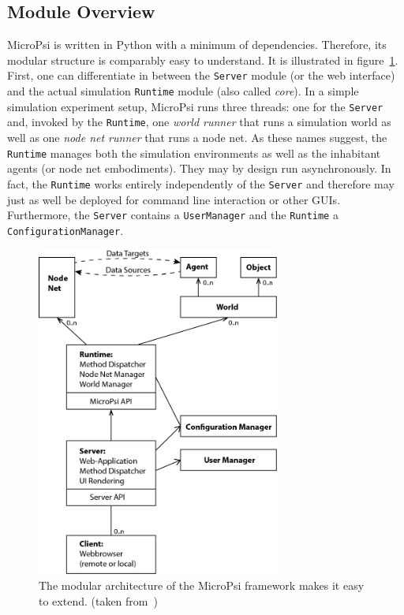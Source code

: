         \subsection{Module Overview}
MicroPsi is written in Python with a minimum of dependencies. Therefore, its  modular structure is comparably easy to understand. It is illustrated in figure~\ref{micropsi2_modules}. First, one can differentiate in between the \texttt{Server} module (or the web interface) and the actual simulation \texttt{Runtime} module (also called \emph{core}). In a simple simulation experiment setup, MicroPsi runs three threads: one for the \texttt{Server} and, invoked by the \texttt{Runtime}, one \emph{world runner} that runs a simulation world as well as one \emph{node net runner} that runs a node net. As these names suggest, the \texttt{Runtime} manages both the simulation environments as well as the inhabitant agents (or node net embodiments). They may by design run asynchronously. In fact, the \texttt{Runtime} works entirely independently of the \texttt{Server} and therefore may just as well be deployed for command line interaction or other GUIs. Furthermore, the \texttt{Server} contains a \texttt{UserManager} and the \texttt{Runtime} a \texttt{ConfigurationManager}.~\cite{conf/agi/Bach12}
\\          
          
\begin{figure}[h]
  \centering
    \includegraphics[width=8cm]{graphics/micropsi2_uml}
  \caption{The modular architecture of the MicroPsi framework makes it easy to extend. (taken from~\cite{conf/agi/Bach12})}
  \label{micropsi2_modules}
\end{figure}

